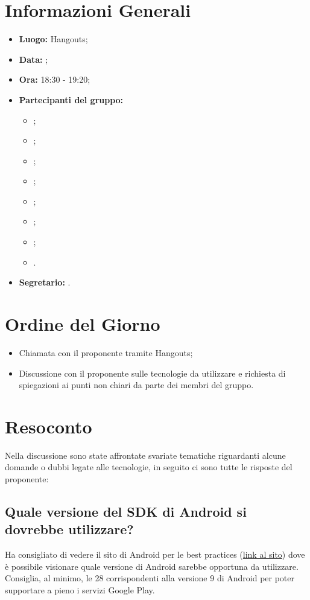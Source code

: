 \section{Informazioni Generali}
\begin{itemize}
\item \textbf{Luogo:} Hangouts;
\item \textbf{Data:} \Data;
\item \textbf{Ora:} 18:30 - 19:20;
\item \textbf{Partecipanti del gruppo:}
	\begin{itemize}
	\item \AT{}; 
	\item \CE{}; 
	\item \DF{};
	\item \LD{};
	\item \PF{};
	\item \SE{};
	\item \BR{};
	\item \MC{}.
	\end{itemize} 
\item \textbf{Segretario:} \MC{}.
\end{itemize}


\section{Ordine del Giorno}
\begin{itemize}
	\item Chiamata con il proponente tramite Hangouts;
	\item Discussione con il proponente sulle tecnologie da utilizzare e richiesta di spiegazioni ai punti non chiari da parte dei membri del gruppo.
\end{itemize}

\section{Resoconto}
Nella discussione sono state affrontate svariate tematiche riguardanti alcune domande o dubbi legate alle tecnologie, in seguito ci sono tutte le risposte del proponente:

\subsection{Quale versione del SDK di Android si dovrebbe utilizzare?}
Ha consigliato di vedere il sito di Android per le best practices (\href{https://developer.android.com/distribute/best-practices}{link al sito}) dove è possibile visionare quale versione  di Android sarebbe opportuna da utilizzare. 
Consiglia, al minimo, le  28 corrispondenti alla versione 9 di Android per poter supportare a pieno i servizi Google Play.


